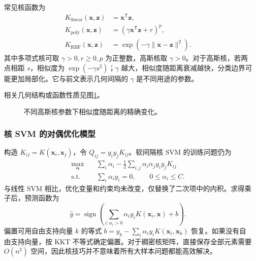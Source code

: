常见核函数为
\begin{align*}
K_{\mathrm{linear}}(\boldsymbol x,\boldsymbol z)&=\boldsymbol x^{\mathsf T}\boldsymbol z,\\
K_{\mathrm{poly}}(\boldsymbol x,\boldsymbol z)&=(\gamma\boldsymbol x^{\mathsf T}\boldsymbol z+r)^p,\\
K_{\mathrm{RBF}}(\boldsymbol x,\boldsymbol z)&=\exp(-\gamma\|\boldsymbol x-\boldsymbol z\|^2).
\end{align*}
其中多项式核可取 $\gamma>0,r\geq0,p$ 为正整数，高斯核取 $\gamma>0$。对于高斯核，若两点相距 $s$，相似度为 $\exp(-\gamma s^2)$；$\gamma$ 越大，相似度随距离衰减越快，分类边界可能更加局部化。它与前文表示几何间隔的 $\gamma$ 是不同用途的参数。

相关几何结构或函数性质见图\ref{fig:svm-rbf-width}。
\begin{figure}[htbp]\centering
{}
\caption{不同高斯核参数下相似度随距离的精确变化。}
\label{fig:svm-rbf-width}
\end{figure}

\subsubsection{核 SVM 的对偶优化模型}

构造 $K_{ij}=K(\boldsymbol x_i,\boldsymbol x_j)$，令 $Q_{ij}=y_i y_jK_{ij}$。软间隔核 SVM 的训练问题仍为
\[
\begin{aligned}
\max_{\boldsymbol\alpha}\quad&
\sum_i\alpha_i-\frac12\sum_{i,j}\alpha_i\alpha_j y_i y_jK_{ij}\\
\text{s.t.}\quad&\sum_i\alpha_i y_i=0,\qquad 0\leq\alpha_i\leq C.
\end{aligned}
\]
与线性 SVM 相比，优化变量和约束均未改变，仅替换了二次项中的内积。求得乘子后，预测函数为
\begin{equation}\label{eq:svm-kernel-decision}
\hat y=\operatorname{sign}\left(\sum_{i:\alpha_i>0}\alpha_i y_i
K(\boldsymbol x_i,\boldsymbol x)+b\right).
\end{equation}
偏置可用自由支持向量 $k$ 的等式
$b=y_k-\sum_i\alpha_i y_iK(\boldsymbol x_i,\boldsymbol x_k)$ 恢复。如果没有自由支持向量，按 KKT 不等式确定偏置。对于稠密核矩阵，直接保存全部元素需要 $O(n^2)$ 空间，因此核技巧并不意味着所有大样本问题都能高效解决。

